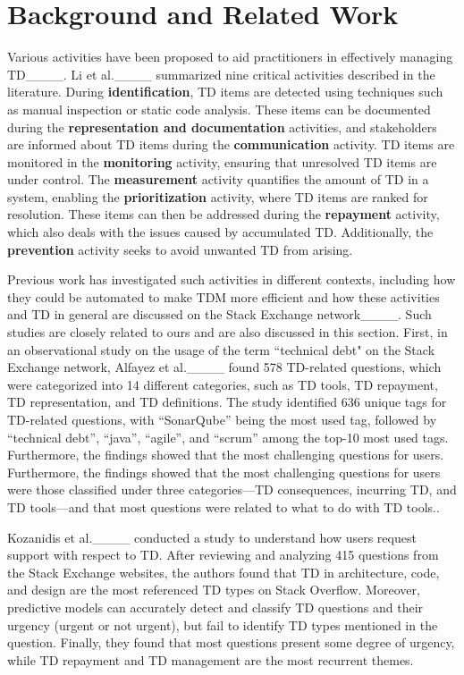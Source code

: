 \section{Background and Related Work}
\label{sec:rw}

Various activities have been proposed to aid practitioners in effectively managing TD____. Li et al.____ summarized nine critical activities described in the literature. During \textbf{identification}, TD items are detected using techniques such as manual inspection or static code analysis. These items can be documented during the \textbf{representation and documentation} activities, and stakeholders are informed about TD items during the \textbf{communication} activity. TD items are monitored in the \textbf{monitoring} activity, ensuring that unresolved TD items are under control. The \textbf{measurement} activity quantifies the amount of TD in a system, enabling the \textbf{prioritization} activity, where TD items are ranked for resolution. These items can then be addressed during the \textbf{repayment} activity, which also deals with the issues caused by accumulated TD. Additionally, the \textbf{prevention} activity seeks to avoid unwanted TD from arising.

Previous work has investigated such activities in different contexts, including how they could be automated to make TDM more efficient and how these activities and TD in general are discussed on the Stack Exchange network____. Such studies are closely related to ours and are also discussed in this section. First, in an observational study on the usage of the term ``technical debt" on the Stack Exchange network, Alfayez et al.____ found 578 TD-related questions, which were categorized into 14 different categories, such as TD tools, TD repayment, TD representation, and TD definitions. The study identified 636 unique tags for TD-related questions, with ``SonarQube'' being the most used tag, followed by ``technical debt'', ``java'', ``agile'', and ``scrum'' among the top-10 most used tags. Furthermore, the findings showed that the most challenging questions for users. Furthermore, the findings showed that the most challenging questions for users were those classified under three categories---TD consequences, incurring TD, and TD tools---and that most questions were related to what to do with TD tools..

Kozanidis et al.____ conducted a study to understand how users request support with respect to TD. After reviewing and analyzing 415 questions from the Stack Exchange websites, the authors found that TD in architecture, code, and design are the most referenced TD types on Stack Overflow. Moreover, predictive models can accurately detect and classify TD questions and their urgency (urgent or not urgent), but fail to identify TD types mentioned in the question. Finally, they found that most questions present some degree of urgency, while TD repayment and TD management are the most recurrent themes.

